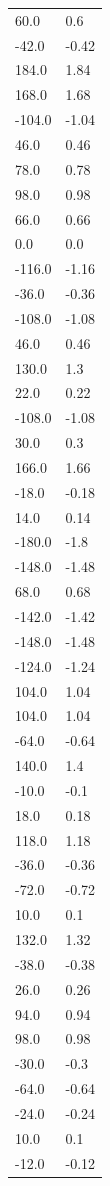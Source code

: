 \begin{longtable}{ll}
60.0 & 0.6 \\
-42.0 & -0.42 \\
184.0 & 1.84 \\
168.0 & 1.68 \\
-104.0 & -1.04 \\
46.0 & 0.46 \\
78.0 & 0.78 \\
98.0 & 0.98 \\
66.0 & 0.66 \\
0.0 & 0.0 \\
-116.0 & -1.16 \\
-36.0 & -0.36 \\
-108.0 & -1.08 \\
46.0 & 0.46 \\
130.0 & 1.3 \\
22.0 & 0.22 \\
-108.0 & -1.08 \\
30.0 & 0.3 \\
166.0 & 1.66 \\
-18.0 & -0.18 \\
14.0 & 0.14 \\
-180.0 & -1.8 \\
-148.0 & -1.48 \\
68.0 & 0.68 \\
-142.0 & -1.42 \\
-148.0 & -1.48 \\
-124.0 & -1.24 \\
104.0 & 1.04 \\
104.0 & 1.04 \\
-64.0 & -0.64 \\
140.0 & 1.4 \\
-10.0 & -0.1 \\
18.0 & 0.18 \\
118.0 & 1.18 \\
-36.0 & -0.36 \\
-72.0 & -0.72 \\
10.0 & 0.1 \\
132.0 & 1.32 \\
-38.0 & -0.38 \\
26.0 & 0.26 \\
94.0 & 0.94 \\
98.0 & 0.98 \\
-30.0 & -0.3 \\
-64.0 & -0.64 \\
-24.0 & -0.24 \\
10.0 & 0.1 \\
-12.0 & -0.12 \\

\end{longtable}
